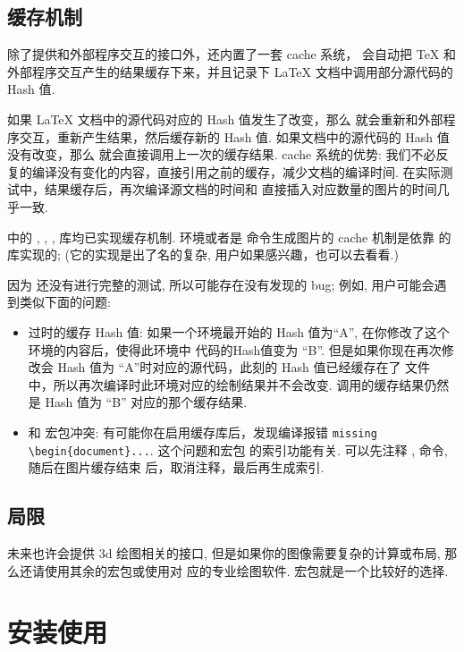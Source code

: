 \documentclass[
  hyper, lang=cn, 
  class=l3dox, 
]{../../zlatex/code/ztex}
\begin{document}
\subsection{缓存机制}
\zTikZ{} 除了提供和外部程序交互的接口外，还内置了一套 cache 系统，\zTikZ{} 会自动把 \TeX{} 和
外部程序交互产生的结果缓存下来，并且记录下 \LaTeX{} 文档中调用部分源代码的 Hash 值. 

如果 \LaTeX{} 文档中的源代码对应的 Hash 值发生了改变，那么 \zTikZ{} 就会重新和外部程序交互，重新产生结果，然后缓存新的 Hash 值.
如果文档中的源代码的 Hash 值没有改变，那么 \zTikZ{} 就会直接调用上一次的缓存结果. cache 系统的优势:
我们不必反复的编译没有变化的内容，直接引用之前的缓存，减少文档的编译时间. 在实际测试中，结果缓存后，再次编译源文档的时间和
直接插入对应数量的图片的时间几乎一致.

\zTikZ{} 中的 , , ,  库均已实现缓存机制. 
 环境或者是 \cmd{\tikz} 命令生成图片的 cache 机制是依靠 \TikZ{} 的  
库实现的; (它的实现是出了名的复杂, 用户如果感兴趣，也可以去看看.)


因为 \ztikz{} 还没有进行完整的测试, 所以可能存在没有发现的 bug; 例如, 用户可能会遇到类似下面的问题:
\begin{itemize}
  \item 过时的缓存 Hash 值: 如果一个环境最开始的 Hash 值为``A'', 在你修改了这个环境的内容后，使得此环境中
    代码的Hash值变为 ``B''. 但是如果你现在再次修改会 Hash 值为 ``A''时对应的源代码，此刻的 Hash 值已经缓存在了
    文件  中，所以再次编译时此环境对应的绘制结果并不会改变. 调用的缓存结果仍然是 Hash 值为 ``B''
    对应的那个缓存结果. 
  \item 和  宏包冲突: 有可能你在启用缓存库后，发现编译报错 \texttt{missing \textbackslash begin\{document\}...}. 
    这个问题和宏包  的索引功能有关. 可以先注释 ,  命令, 随后在图片缓存结束
    后，取消注释，最后再生成索引.
\end{itemize}


\subsection{局限}
\zTikZ{} 未来也许会提供 3d 绘图相关的接口, 但是如果你的图像需要复杂的计算或布局, 那么还请使用其余的宏包或使用对
应的专业绘图软件.  宏包就是一个比较好的选择.


\clearpage
\section{安装使用}
\end{document}
